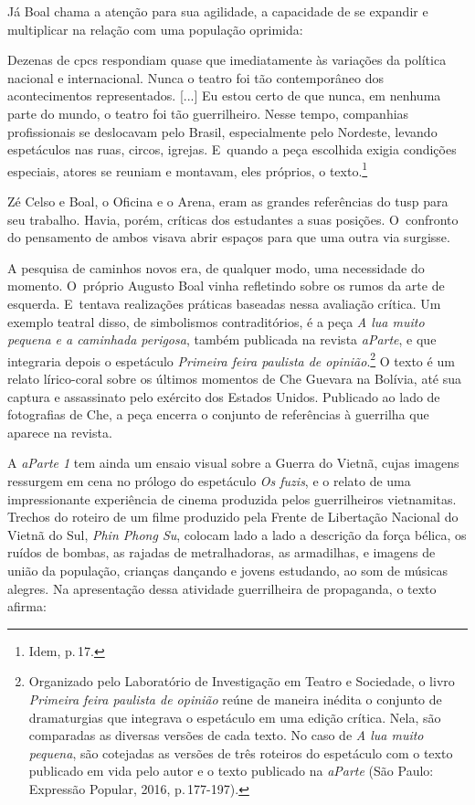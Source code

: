 Já Boal chama a atenção para sua agilidade, a capacidade de se expandir e multiplicar na
relação com uma população oprimida:

\startblockquote
Dezenas de {\sc cpc}s respondiam quase que imediatamente às variações da
política nacional e internacional. Nunca o teatro foi tão contemporâneo
dos acontecimentos representados. {[}...{]} Eu estou certo de que nunca,
em nenhuma parte do mundo, o teatro foi tão guerrilheiro. Nesse tempo,
companhias profissionais se deslocavam pelo Brasil, especialmente pelo
Nordeste, levando espetáculos nas ruas, circos, igrejas. E~quando a peça
escolhida exigia condições especiais, atores se reuniam e montavam, eles
próprios, o texto.\footnote{Idem, p.\,17.}
\stopblockquote

Zé Celso e Boal, o Oficina e o Arena, eram as grandes referências do
{\sc tusp} para seu trabalho. Havia, porém, críticas dos estudantes a suas
posições. O~confronto do pensamento de ambos visava abrir espaços para
que uma outra via surgisse.

A pesquisa de caminhos novos era, de qualquer modo, uma necessidade do
momento. O~próprio Augusto Boal vinha refletindo sobre os rumos da arte
de esquerda. E~tentava realizações práticas baseadas nessa avaliação
crítica. Um exemplo teatral disso, de simbolismos contraditórios, é a
peça {\it A lua muito pequena e a caminhada perigosa}, também publicada
na revista {\it aParte}, e que integraria depois o espetáculo
{\it Primeira feira paulista de opinião}.\footnote{Organizado
  pelo Laboratório de Investigação em Teatro e Sociedade, o livro {\it Primeira feira paulista de opinião} reúne de maneira inédita o conjunto de dramaturgias que integrava o espetáculo em
  uma edição crítica. Nela, são comparadas as diversas versões de cada
  texto. No caso de {\it A lua muito pequena}, são cotejadas as versões
  de três roteiros do espetáculo com o texto publicado em vida pelo
  autor e o texto publicado na {\it aParte} (São Paulo: Expressão
  Popular, 2016, p.\,177-197).} O texto é um relato lírico-coral sobre os
últimos momentos de Che Guevara na Bolívia, até sua captura e
assassinato pelo exército dos Estados Unidos. Publicado ao lado de
fotografias de Che, a peça encerra o conjunto de referências à guerrilha
que aparece na revista.

A {\it aParte 1} tem ainda um ensaio visual sobre a Guerra do Vietnã,
cujas imagens ressurgem em cena no prólogo do espetáculo {\it Os fuzis},
e o relato de uma impressionante experiência de cinema produzida pelos
guerrilheiros vietnamitas. Trechos do roteiro de um filme produzido pela
Frente de Libertação Nacional do Vietnã do Sul, {\it Phin Phong Su},
colocam lado a lado a descrição da força bélica, os ruídos de bombas, as
rajadas de metralhadoras, as armadilhas, e imagens de união da
população, crianças dançando e jovens estudando, ao som de músicas
alegres. Na apresentação dessa atividade guerrilheira de propaganda, o
texto afirma:

